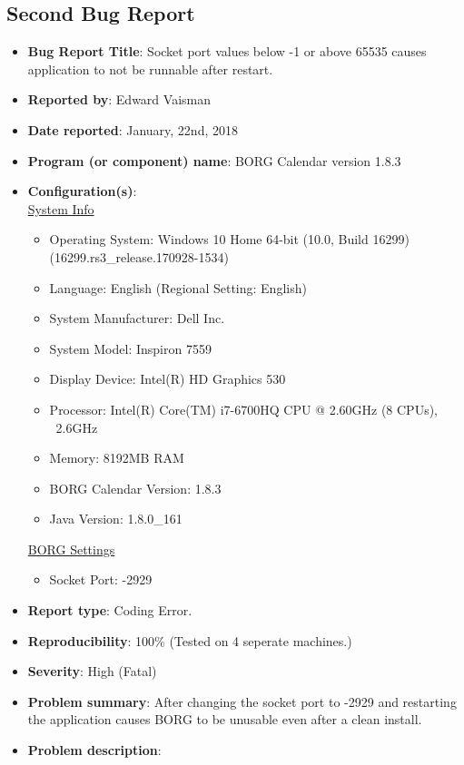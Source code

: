\documentclass[fontsize=12pt,paper=letter,twoside]{scrartcl}
\begin{document}
\newpage
\subsection{Second Bug Report}

\begin{itemize}
\item \textbf{Bug Report Title}: Socket port values below -1 or above 65535 causes application to not be runnable after restart.
\item \textbf{Reported by}: Edward Vaisman
\item \textbf{Date reported}: January, 22nd, 2018
\item \textbf{Program (or component) name}: BORG Calendar version 1.8.3
\item \textbf{Configuration(s)}:\\
\underline{System Info}
\begin{itemize}
\item{Operating System: Windows 10 Home 64-bit (10.0, Build 16299) (16299.rs3\_release.170928-1534)}
\item {Language: English (Regional Setting: English)}
\item {System Manufacturer: Dell Inc.}
\item {System Model: Inspiron 7559}
\item {Display Device: Intel(R) HD Graphics 530}
\item {Processor: Intel(R) Core(TM) i7-6700HQ CPU @ 2.60GHz (8 CPUs), ~2.6GHz }
\item {Memory: 8192MB RAM}
\item {BORG Calendar Version: 1.8.3}
\item {Java Version: 1.8.0\_161}
\end{itemize}
\underline{BORG Settings}
\begin{itemize}
\item{Socket Port: -2929}
\end{itemize}
\item \textbf{Report type}: Coding Error.
\item \textbf{Reproducibility}: 100\% (Tested on 4 seperate machines.)
\item \textbf{Severity}: High (Fatal)
\item \textbf{Problem summary}: After changing the socket port to -2929 and restarting the application causes BORG to be unusable even after a clean install.
\item \textbf{Problem description}:\\

\end{itemize}
\end{document}
